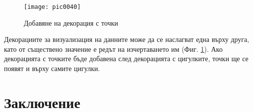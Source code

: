\begin{figure}[h!]
  \centering
  \texttt{[image: pic0040]}
  \caption{Добавяне на декорация с точки}
\label{figure0040}
\end{figure}
\FloatBarrier

Декорациите за визуализация на данните може да се наслагват една върху друга, като от съществено значение е редът на изчертаването им (Фиг. \ref{figure0040}). Ако декорацията с точките бъде добавена след декорацията с цигулките, точки ще се появят и върху самите цигулки. 

\section*{Заключение}

